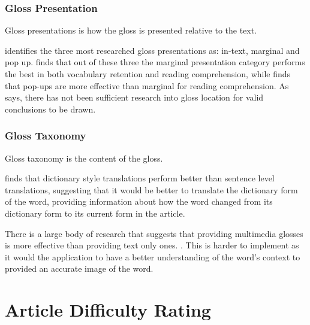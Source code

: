 \subsubsection{Gloss Presentation}

Gloss presentations is how the gloss is presented relative to the text. 

\textcite{chen2016} identifies the three most researched gloss presentations as: in-text, marginal and pop up.  \textcite{abuseileek2008} finds that out of these three the marginal presentation category performs the best in both vocabulary retention and reading comprehension, while \textcite{marefat2016} finds that pop-ups are more effective than marginal for reading comprehension. As \textcite{chen2016} says, there has not been sufficient research into gloss location for valid conclusions to be drawn. 

\subsubsection{Gloss Taxonomy}

Gloss taxonomy is the content of the gloss.

\textcite{gettys2001} finds that dictionary style translations perform better than sentence level translations, suggesting that it would be better to translate the dictionary form of the word, providing information about how the word changed from its dictionary form to its current form in the article. 

There is a large body of research that suggests that providing multimedia glosses is more effective than providing text only ones. \autocite{yoshii2006, kost1999}. This is harder to implement  as it would the application to have a better understanding of the word's context to provided an accurate image of the word. 


\section{Article Difficulty Rating}